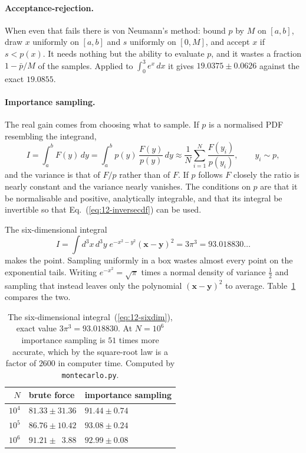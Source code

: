 \paragraph{Acceptance-rejection.}
When even that fails there is von Neumann's method: bound $p$ by $M$ on
$[a,b]$, draw $x$ uniformly on $[a,b]$ and $s$ uniformly on $[0,M]$, and
accept $x$ if $s<p(x)$.  It needs nothing but the ability to evaluate $p$, and
it wastes a fraction $1-\bar{p}/M$ of the samples.  Applied to
$\int_0^3 e^x\,dx$ it gives $19.0375\pm0.0626$ against the exact $19.0855$.

\paragraph{Importance sampling.}
The real gain comes from choosing what to sample.  If $p$ is a normalised PDF
resembling the integrand,
\begin{equation}
  I = \int_a^b F(y)\,dy = \int_a^b p(y)\,\frac{F(y)}{p(y)}\,dy
   \approx \frac{1}{N}\sum_{i=1}^{N}\frac{F(y_i)}{p(y_i)},
  \qquad y_i\sim p ,
  \label{eq:12-importance}
\end{equation}
and the variance is that of $F/p$ rather than of $F$.  If $p$ follows $F$
closely the ratio is nearly constant and the variance nearly vanishes.  The
conditions on $p$ are that it be normalisable and positive, analytically
integrable, and that its integral be invertible so that
Eq.~(\ref{eq:12-inversecdf}) can be used.

The six-dimensional integral
\begin{equation}
  I = \int d^3x\,d^3y\;e^{-x^2-y^2}\left(\bm{x}-\bm{y}\right)^2
    = 3\pi^3 = 93.018830\ldots
  \label{eq:12-sixdim}
\end{equation}
makes the point.  Sampling uniformly in a box wastes almost every point on the
exponential tails.  Writing $e^{-x^2}=\sqrt{\pi}$ times a normal density of
variance $\tfrac12$ and sampling that instead leaves only the polynomial
$(\bm{x}-\bm{y})^2$ to average.  Table~\ref{tab:12-sixdim} compares the two.

\begin{table}[h]
\centering
\renewcommand{\arraystretch}{1.25}
\setlength{\tabcolsep}{14pt}
\begin{tabular}{rll}
\toprule
$N$ & brute force & importance sampling\\
\midrule
$10^4$ & $81.33\pm31.36$ & $91.44\pm0.74$\\
$10^5$ & $86.76\pm10.42$ & $93.08\pm0.24$\\
$10^6$ & $91.21\pm\phantom{0}3.88$ & $92.99\pm0.08$\\
\bottomrule
\end{tabular}
\caption{The six-dimensional integral~(\ref{eq:12-sixdim}), exact value
$3\pi^3=93.018830$.  At $N=10^6$ importance sampling is $51$ times more
accurate, which by the square-root law is a factor of $2600$ in computer time.
Computed by \texttt{montecarlo.py}.}
\label{tab:12-sixdim}
\end{table}

